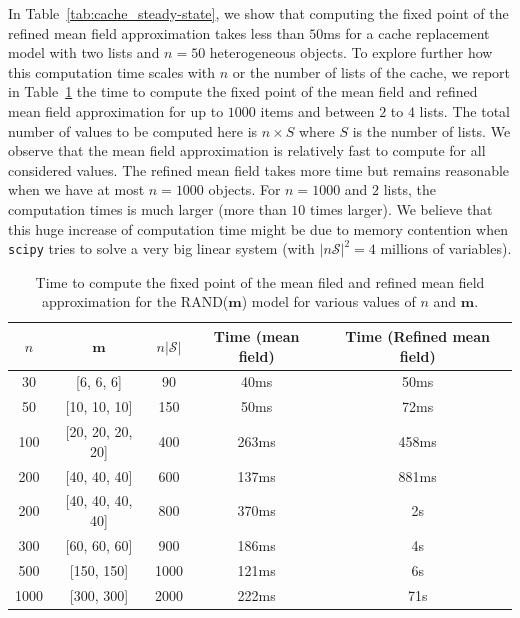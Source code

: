 \documentclass[acmsmall]{acmart}
\newcommand\bm{\mathbf{m}}
\newcommand\calS{\mathcal{S}}
\begin{document}
{\color{myorange}
In Table~\ref{tab:cache_steady-state}, we show that computing the fixed point of the refined mean field approximation takes less than $50$ms for a cache replacement model with two lists and $n=50$ heterogeneous objects.  To explore further how this computation time scales with $n$ or the number of lists of the cache, we report in Table~\ref{table:computation_time} the time to compute the fixed point of the mean field and refined mean field approximation for up to $1000$ items and between $2$ to $4$ lists. The total number of values to be computed here is $n\times S$ where $S$ is the number of lists. We observe that the mean field approximation is relatively fast to compute for all considered values. The refined mean field takes more time but remains reasonable when we have at most $n=1000$ objects. For $n=1000$ and $2$ lists, the computation times is much larger (more than $10$ times larger). We believe that this huge increase of computation time might be due to memory contention when \texttt{scipy} tries to solve a very big linear system (with $|n\calS|^2 = 4\text{ millions}$ of variables). 

\begin{table}[ht]
  \caption{Time to compute the fixed point of the mean filed and refined mean field approximation for the RAND($\bm$) model for various values of $n$ and $\bm$.}
  \label{table:computation_time}
  \color{myorange}
  \begin{tabular}{|ccc|c|c|}
    \hline
    $n$ & $\mathbf{m}$ & $n|\calS|$ & Time (mean field) & Time (Refined mean field)\\\hline
    30 & [6, 6, 6] & 90 & 40ms &50ms\\\hline
    50 & [10, 10, 10] & 150 & 50ms &72ms\\\hline
    100 & [20, 20, 20, 20] & 400 & 263ms &458ms\\\hline
    200 & [40, 40, 40] & 600 & 137ms &881ms\\\hline
    200 & [40, 40, 40, 40] & 800 & 370ms &2s\\\hline
    300 & [60, 60, 60] & 900 & 186ms &4s\\\hline
    500 & [150, 150] & 1000 & 121ms &6s\\\hline
    1000 & [300, 300] & 2000 & 222ms &71s\\\hline
  \end{tabular}
\end{table}

}

\end{document}
